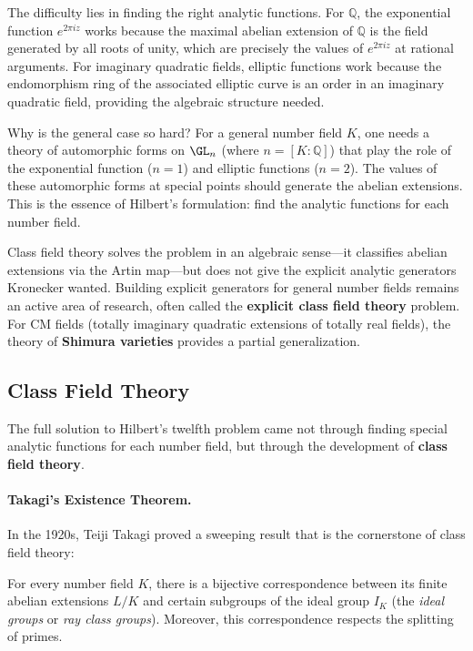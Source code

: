 The difficulty lies in finding the right analytic functions. For $\mathbb{Q}$, the exponential function $e^{2\pi i z}$ works because the maximal abelian extension of $\mathbb{Q}$ is the field generated by all roots of unity, which are precisely the values of $e^{2\pi i z}$ at rational arguments. For imaginary quadratic fields, elliptic functions work because the endomorphism ring of the associated elliptic curve is an order in an imaginary quadratic field, providing the algebraic structure needed.

Why is the general case so hard? For a general number field $K$, one needs a theory of automorphic forms on $\GL_n$ (where $n = [K:\mathbb{Q}]$) that play the role of the exponential function ($n=1$) and elliptic functions ($n=2$). The values of these automorphic forms at special points should generate the abelian extensions. This is the essence of Hilbert's formulation: find the analytic functions for each number field.

Class field theory solves the problem in an algebraic sense---it classifies abelian extensions via the Artin map---but does not give the explicit analytic generators Kronecker wanted. Building explicit generators for general number fields remains an active area of research, often called the \textbf{explicit class field theory} problem. For CM fields (totally imaginary quadratic extensions of totally real fields), the theory of \textbf{Shimura varieties} provides a partial generalization.

\subsection{Class Field Theory}

The full solution to Hilbert's twelfth problem came not through finding special analytic functions for each number field, but through the development of \textbf{class field theory}.

\paragraph{Takagi's Existence Theorem.} In the 1920s, Teiji Takagi proved a sweeping result that is the cornerstone of class field theory:

\begin{theorem}[Takagi, 1920]\label{thm:takagi-cft}
For every number field $K$, there is a bijective correspondence between its finite abelian extensions $L/K$ and certain subgroups of the ideal group $I_K$ (the \emph{ideal groups} or \emph{ray class groups}). Moreover, this correspondence respects the splitting of primes.
\end{theorem}

